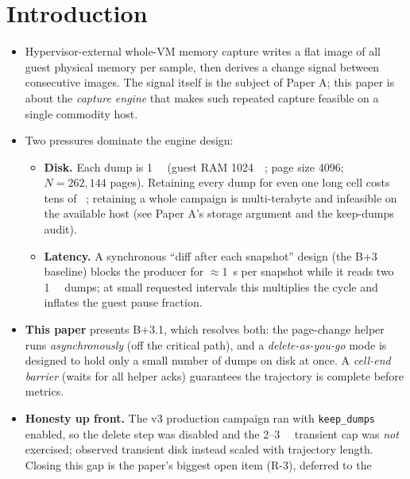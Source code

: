 \documentclass[conference]{IEEEtran}
\begin{document}
\section{Introduction}
\begin{itemize}
  \item Hypervisor-external whole-VM memory capture writes a flat image of all
        guest physical memory per sample, then derives a change signal between
        consecutive images. The signal itself is the subject of Paper A; this
        paper is about the \emph{capture engine} that makes such repeated
        capture feasible on a single commodity host.
  \item Two pressures dominate the engine design:
    \begin{itemize}
      \item \textbf{Disk.} Each dump is \SI{1}{\gibi\byte}
            (guest RAM \SI{1024}{\mebi\byte}; page size \SI{4096}{\byte};
            $N = 262{,}144$ pages). Retaining every dump for even one long cell
            costs tens of \si{\gibi\byte}; retaining a whole campaign is
            multi-terabyte and infeasible on the available host
            (see Paper A's storage argument and the keep-dumps audit).
      \item \textbf{Latency.} A synchronous ``diff after each snapshot'' design
            (the B+3 baseline) blocks the producer for $\approx$\SI{1}{\second}
            per snapshot while it reads two \SI{1}{\gibi\byte} dumps; at small
            requested intervals this multiplies the cycle and inflates the
            guest pause fraction.
    \end{itemize}
  \item \textbf{This paper} presents B+3.1, which resolves both: the
        page-change helper runs \emph{asynchronously} (off the critical path),
        and a \emph{delete-as-you-go} mode is designed to hold only a small
        number of dumps on disk at once. A \emph{cell-end barrier} (waits for
        all helper acks) guarantees the trajectory is complete before metrics.
  \item \textbf{Honesty up front.} The v3 production campaign ran with
        \texttt{keep\_dumps} enabled, so the delete step was disabled and the
        \SI{2}{}--\SI{3}{\gibi\byte} transient cap was \emph{not} exercised;
        observed transient disk instead scaled with trajectory length. Closing
        this gap is the paper's biggest open item (R-3), deferred to the

\end{itemize}
\end{document}
